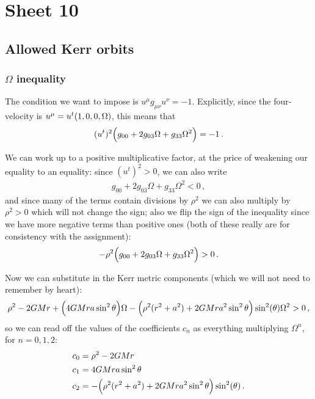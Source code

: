 \documentclass[main.tex]{subfiles}
\begin{document}
\section{Sheet 10}

\subsection{Allowed Kerr orbits}

\subsubsection{\(\Omega \) inequality}

The condition we want to impose is \(u^{\mu } g_{\mu \nu } u^{\nu } = -1\). Explicitly, since the four-velocity is  \(u^{\mu } = u^{t} \qty(1, 0, 0, \Omega )\), this means that 
%
\begin{align}
  (u^{t})^2 \qty(g_{00} + 2 g_{03} \Omega + g_{33} \Omega^2 ) = -1
\,.
\end{align}

We can work up to a positive multiplicative factor, at the price of weakening our equality to an equality: since \((u^{t})^2 > 0\), we can also write 
%
\begin{align}
  g_{00} + 2 g_{03} \Omega + g_{33} \Omega^2 < 0
\,,
\end{align}
%
and since many of the terms contain divisions by \(\rho^2\) we can also multiply by \(\rho^2>0\) which will not change the sign; also we flip the sign of the inequality since we have more negative terms than positive ones (both of these really are for consistency with the assignment):
%
\begin{align}
 - \rho^2 \qty(g_{00} + 2 g_{03} \Omega + g_{33} \Omega^2 ) > 0 
\,.
\end{align}

Now we can substitute in the Kerr metric components (which we will not need to remember by heart): 
%
\begin{align}
  \rho^2 - 2GMr 
  + \qty(4 GMra \sin^2\theta ) \Omega 
  - \qty(\rho^2 (r^2 + a^2 ) + 2GMra^2 \sin^2\theta ) \sin^2(\theta)  \Omega^2 > 0
\,,
\end{align}
%
so we can read off the values of the coefficients \(c_{n}\) as everything multiplying \(\Omega^{n}\), for \(n = 0, 1, 2\): 
%
\begin{subequations}
\begin{align}
    c_0 &= \rho^2 - 2GM r   \\
    c_1 &= 4 GMra \sin^2\theta   \\
    c_2 &= - \qty(\rho^2 (r^2 + a^2 ) + 2GMra^2 \sin^2\theta ) \sin^2(\theta)
\,.
\end{align}
\end{subequations}
\end{document}
